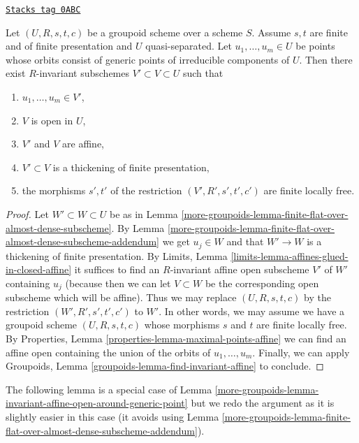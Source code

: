 \begin{lemma}
\label{more-groupoids-lemma-invariant-affine-open-around-generic-point}
\href{https://stacks.math.columbia.edu/tag/0ABC}{\texttt{Stacks tag 0ABC}}

Let $(U, R, s, t, c)$ be a groupoid scheme over a scheme $S$. Assume $s, t$
are finite and of finite presentation and $U$ quasi-separated. Let
$u_1, \ldots, u_m \in U$ be points whose orbits consist of generic points
of irreducible components of $U$. Then there exist $R$-invariant subschemes
$V' \subset V \subset U$ such that
\begin{enumerate}
\item $u_1, \ldots, u_m \in V'$,
\item $V$ is open in $U$,
\item $V'$ and $V$ are affine,
\item $V' \subset V$ is a thickening of finite presentation,
\item the morphisms $s', t'$ of the restriction $(V', R', s', t', c')$
are finite locally free.
\end{enumerate}
\end{lemma}

\begin{proof}
Let $W' \subset W \subset U$ be as in
Lemma \ref{more-groupoids-lemma-finite-flat-over-almost-dense-subscheme}.
By Lemma \ref{more-groupoids-lemma-finite-flat-over-almost-dense-subscheme-addendum}
we get $u_j \in W$ and that $W' \to W$ is a thickening of finite presentation.
By Limits, Lemma \ref{limits-lemma-affines-glued-in-closed-affine}
it suffices to find an $R$-invariant affine open subscheme
$V'$ of $W'$ containing $u_j$ (because then we can let $V \subset W$
be the corresponding open subscheme which will be affine).
Thus we may replace $(U, R, s, t, c)$ by the restriction
$(W', R', s', t', c')$ to $W'$.
In other words, we may assume we have a groupoid scheme $(U, R, s, t, c)$
whose morphisms $s$ and $t$ are finite locally free.
By Properties, Lemma \ref{properties-lemma-maximal-points-affine}
we can find an affine open containing the union of the orbits of
$u_1, \ldots, u_m$. Finally, we can apply
Groupoids, Lemma \ref{groupoids-lemma-find-invariant-affine}
to conclude.
\end{proof}

The following lemma is a special case of
Lemma \ref{more-groupoids-lemma-invariant-affine-open-around-generic-point}
but we redo the argument as it is slightly easier in this case
(it avoids using
Lemma \ref{more-groupoids-lemma-finite-flat-over-almost-dense-subscheme-addendum}).

